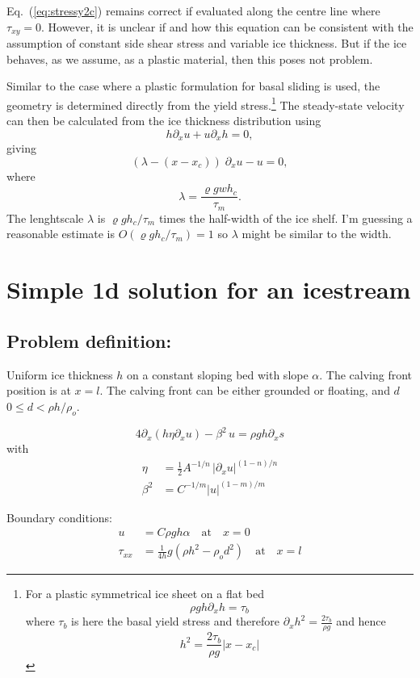 \documentclass[10pt,a4paper]{book}
\newcommand{\p}{\partial}
\newcommand{\txy}{\tau_{xy}}
\begin{document}
Eq.~(\ref{eq:stressy2c}) remains correct if evaluated along the centre
line where $\txy=0$. However, it is unclear if and how this equation
can be consistent with the assumption of constant side shear stress
and variable ice thickness. But if the ice behaves, as we assume, as a
plastic material, then this poses not problem. 


Similar to the case where a plastic formulation for basal sliding is
used, the geometry is determined directly from the yield
stress.\footnote{For a plastic symmetrical ice sheet on a flat bed
  \[ \rho g h \p_x h = \tau_b \] where $\tau_b$ is here the basal yield
  stress and therefore  $ \p_x h^2 = \frac{2\tau_b}{\rho g}$ and hence 
  \[ h^2= \frac{2\tau_b}{\rho g} |x -x_c| \] } The steady-state
velocity can then be calculated from the ice thickness distribution
using
\[
  h \p_x u + u \p_x h =0,
\]
giving
\[
( \lambda -  (x-x_c) ) \; \p_x u -   u =0,
\]
where
\[
\lambda=\frac{ \varrho g w h_c}{\tau_m} .
\]
The lenghtscale $\lambda$ is $\varrho g h_c/\tau_m$ times the
half-width of the ice shelf. I'm guessing a reasonable estimate is
$O(\varrho g h_c/\tau_m)=1$ so $\lambda$ might be similar to the width.







\chapter{Simple 1d solution for an icestream}

\section{Problem definition:} 
Uniform ice thickness $h$ on a constant sloping bed with slope
$\alpha$. The calving front position is at $x=l$. The calving front
can be either grounded or floating, and $d$ $0\le d < \rho h /\rho_o$.


\[
4 \p_x ( h \eta \p_x u) - \beta^2 \, u= \rho g h \p_x s
\]
with
\begin{align*}
\eta&=\frac{1}{2} A^{-1/n} \, | \p_x u | ^{(1-n)/n}  \\
\beta^2&=C^{-1/m} |u|^{(1-m)/m}
\end{align*}

Boundary conditions: 
\begin{align}
u&=C \rho g h \alpha  \quad \text{at} \quad x=0 \label{eq:bc1} \\
 \tau_{xx}&=\frac{1}{4h} g ( \rho h^2 - \rho_o d^2) \quad \text{at} \quad x=l \label{eq:bc2}
\end{align}
\end{document}
